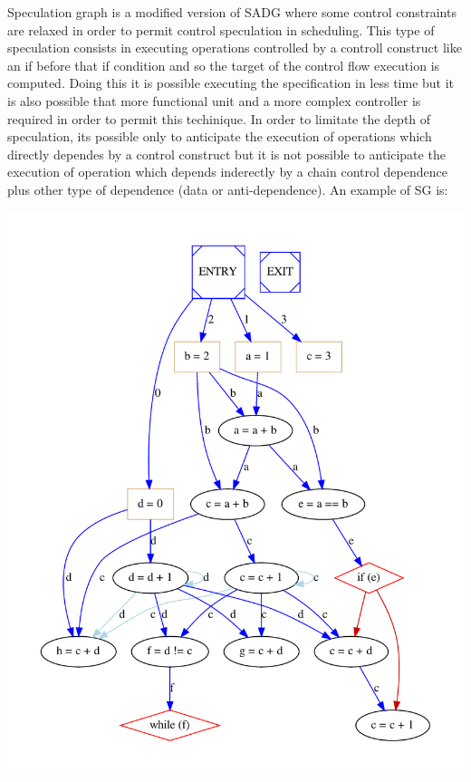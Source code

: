Speculation graph is a modified version of S\+A\+DG where some control constraints are relaxed in order to permit control speculation in scheduling. This type of speculation consists in executing operations controlled by a controll construct like an if before that if condition and so the target of the control flow execution is computed. Doing this it is possible executing the specification in less time but it is also possible that more functional unit and a more complex controller is required in order to permit this techinique. In order to limitate the depth of speculation, it\textquotesingle{}s possible only to anticipate the execution of operations which directly dependes by a control construct but it is not possible to anticipate the execution of operation which depends inderectly by a chain control dependence plus other type of dependence (data or anti-\/dependence). An example of SG is\+: 
\begin{DoxyImageNoCaption}
  \mbox{\includegraphics[width=\textwidth,height=\textheight/2,keepaspectratio=true]{dot_inline_dotgraph_8}}
\end{DoxyImageNoCaption}


